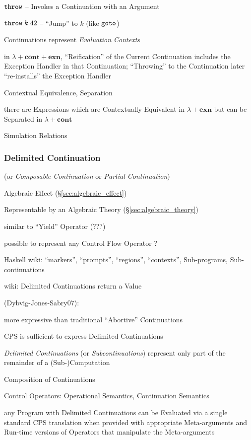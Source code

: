 $\mathtt{throw}$ -- Invokes a Continuation with an Argument

$\mathtt{throw}\;k\;42$ -- ``Jump'' to $k$ (like $\mathtt{goto}$)

Continuations represent \emph{Evaluation Contexts}

in $\lambda + \mathbf{cont} + \mathbf{exn}$, ``Reification'' of the
Current Continuation includes the Exception Handler in that
Continuation; ``Throwing'' to the Continuation later ``re-installs''
the Exception Handler

Contextual Equivalence, Separation %

there are Expressions which are Contextually Equivalent in $\lambda +
\mathbf{exn}$ but can be Separated in $\lambda + \mathbf{cont}$

Simulation Relations



\subsubsection{Delimited Continuation}\label{sec:delimited_continuation}

(or \emph{Composable Continuation} or \emph{Partial Continuation})

Algebraic Effect (\S\ref{sec:algebraic_effect})

Representable by an Algebraic Theory (\S\ref{sec:algebraic_theory})

similar to ``Yield'' Operator (???) %

possible to represent any Control Flow Operator ? %

Haskell wiki: ``markers'', ``prompts'', ``regions'', ``contexts'',
Sub-programs, Sub-continuations

wiki: Delimited Continuations return a Value


(Dybvig-Jones-Sabry07):

more expressive than traditional ``Abortive'' Continuations

CPS is sufficient to express Delimited Continuations

\emph{Delimited Continuations} (or \emph{Subcontinuations}) represent
only part of the remainder of a (Sub-)Computation

Composition of Continuations

Control Operators: Operational Semantics, Continuation Semantics

any Program with Delimited Continuations can be Evaluated via a single
standard CPS translation when provided with appropriate Meta-arguments
and Run-time versions of Operators that manipulate the Meta-arguments

